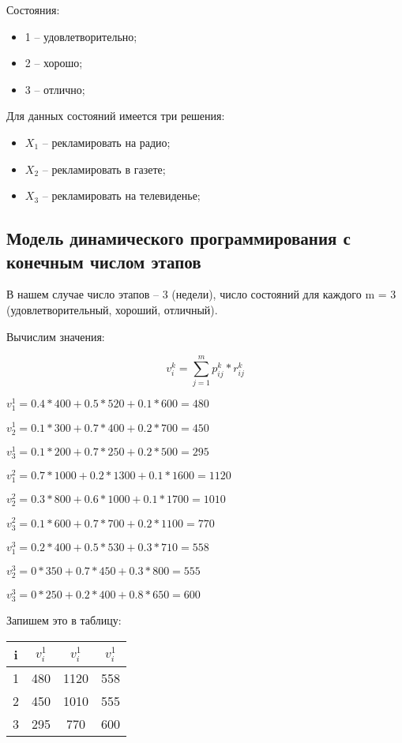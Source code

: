 \documentclass[14pt,a4paper,report]{report}
\begin{document}
Состояния:

\begin{itemize}
	\item 1 -- удовлетворительно;
	\item 2 -- хорошо;
	\item 3 -- отлично;
\end{itemize}

Для данных состояний имеется три решения:

\begin{itemize}
	\item $X_1$ -- рекламировать на радио;
	\item $X_2$ -- рекламировать в газете;
	\item $X_3$ -- рекламировать на телевиденье;
\end{itemize}



\subsection{Модель динамического программирования с конечным числом этапов}

В нашем случае число этапов – 3 (недели), число состояний для каждого m = 3 (удовлетворительный, хороший, отличный).

Вычислим значения:


$$   v_i^k = \sum_{j=1}^m  p_{ij}^k * r_{ij}^k $$

$ v_1^1 = 0.4*400 + 0.5*520 + 0.1*600 = 480$

$ v_2^1 = 0.1*300 + 0.7*400 + 0.2*700 = 450$

$ v_3^1 = 0.1*200 + 0.7*250 + 0.2*500 = 295$

$ v_1^2 = 0.7*1000 + 0.2*1300 + 0.1*1600 = 1120$

$ v_2^2 = 0.3*800 + 0.6*1000 + 0.1*1700 = 1010$

$ v_3^2 = 0.1*600 + 0.7*700 + 0.2*1100 = 770$


$ v_1^3 = 0.2*400 + 0.5*530 + 0.3*710 = 558$

$ v_2^3 = 0*350 + 0.7*450 + 0.3*800 = 555$

$ v_3^3 = 0*250 + 0.2*400 + 0.8*650 = 600$

Запишем это в таблицу:

\begin{table}[h!]
	\centering
	\bgroup
	\def\arraystretch{1}
	\begin{tabular}{ | c | c | c | c | }
		\hline
		i & $ v_i^1 $ & $ v_i^1 $  & $ v_i^1 $ \\ \hline
		1 & 480 & 1120 & 558 \\ \hline
		2 & 450 & 1010 & 555 \\ \hline
		3 & 295 & 770 & 600 \\ \hline
	\end{tabular}
	\egroup
\end{table}
\end{document}
